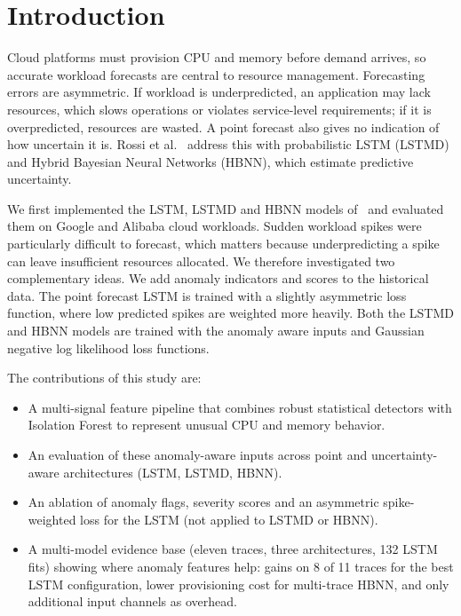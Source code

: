 \documentclass[conference]{IEEEtran}
\begin{document}
\section{Introduction}\label{introduction}

Cloud platforms must provision CPU and memory before demand arrives, so
accurate workload forecasts are central to resource management. Forecasting
errors are asymmetric. If workload is underpredicted, an application may lack
resources, which slows operations or violates service-level requirements; if it
is overpredicted, resources are wasted. A point forecast also gives no
indication of how uncertain it is. Rossi et al.~\cite{ref1} address this with
probabilistic LSTM (LSTMD) and Hybrid Bayesian Neural Networks (HBNN), which
estimate predictive uncertainty.

We first implemented the LSTM, LSTMD and HBNN models of~\cite{ref1} and
evaluated them on Google and Alibaba cloud workloads. Sudden workload spikes
were particularly difficult to forecast, which matters because underpredicting a
spike can leave insufficient resources allocated. We therefore investigated two
complementary ideas. We add anomaly indicators and scores to the historical data. The point forecast LSTM is trained with a slightly asymmetric loss function, where low predicted spikes are weighted more heavily. Both the LSTMD and HBNN models are trained with the anomaly aware inputs and Gaussian negative log likelihood loss functions.

The contributions of this study are:
\begin{itemize}
\item A multi-signal feature pipeline that combines robust statistical
detectors with Isolation Forest to represent unusual CPU and memory behavior.
\item An evaluation of these anomaly-aware inputs across point and
uncertainty-aware architectures (LSTM, LSTMD, HBNN).
\item An ablation of anomaly flags, severity scores and an asymmetric
spike-weighted loss for the LSTM (not applied to LSTMD or HBNN).
\item A multi-model evidence base (eleven traces, three architectures, 132 LSTM
fits) showing where anomaly features help: gains on 8 of 11 traces for the best
LSTM configuration, lower provisioning cost for multi-trace HBNN, and only
additional input channels as overhead.
\end{itemize}
\end{document}

